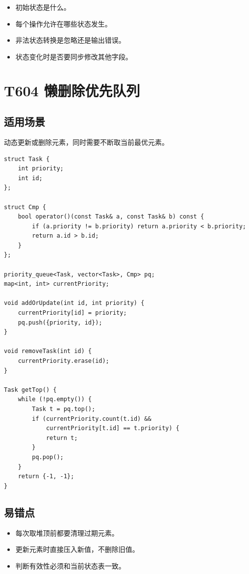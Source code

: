 \begin{itemize}
  \item 初始状态是什么。
  \item 每个操作允许在哪些状态发生。
  \item 非法状态转换是忽略还是输出错误。
  \item 状态变化时是否要同步修改其他字段。
\end{itemize}

\section{T604 懒删除优先队列}\label{sec:09-44}\label{tpl:604}

\subsection{适用场景}

动态更新或删除元素，同时需要不断取当前最优元素。

\begin{lstlisting}
struct Task {
    int priority;
    int id;
};

struct Cmp {
    bool operator()(const Task& a, const Task& b) const {
        if (a.priority != b.priority) return a.priority < b.priority;
        return a.id > b.id;
    }
};

priority_queue<Task, vector<Task>, Cmp> pq;
map<int, int> currentPriority;

void addOrUpdate(int id, int priority) {
    currentPriority[id] = priority;
    pq.push({priority, id});
}

void removeTask(int id) {
    currentPriority.erase(id);
}

Task getTop() {
    while (!pq.empty()) {
        Task t = pq.top();
        if (currentPriority.count(t.id) &&
            currentPriority[t.id] == t.priority) {
            return t;
        }
        pq.pop();
    }
    return {-1, -1};
}
\end{lstlisting}

\subsection{易错点}

\begin{itemize}
  \item 每次取堆顶前都要清理过期元素。
  \item 更新元素时直接压入新值，不删除旧值。
  \item 判断有效性必须和当前状态表一致。
\end{itemize}

